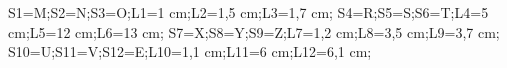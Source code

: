 \documentclass[exercice]{thedocument}%
\begin{document}
%
\>S1=M;\>S2=N;\>S3=O;\>L1=1 cm;\>L2=1,5 cm;\>L3=1,7 cm;%
\>S4=R;\>S5=S;\>S6=T;\>L4=5 cm;\>L5=12 cm;\>L6=13 cm;%
\>S7=X;\>S8=Y;\>S9=Z;\>L7=1,2 cm;\>L8=3,5 cm;\>L9=3,7 cm;%
\>S10=U;\>S11=V;\>S12=E;\>L10=1,1 cm;\>L11=6 cm;\>L12=6,1 cm;%
%
\end{document}
